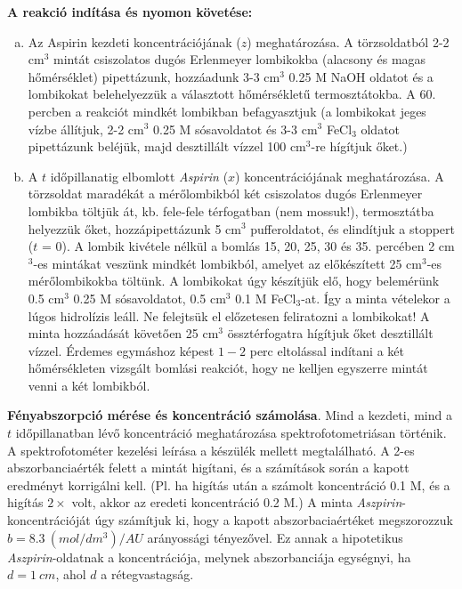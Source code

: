 \documentclass[a4paper, 12pt, twoside]{article}
\begin{document}
\textbf{A reakció indítása és nyomon követése:}

\begin{enumerate}[(a)]
\item Az Aspirin kezdeti koncentrációjának ($z$) meghatározása. A törzsoldatból 2-2 cm$^3$ mintát csiszolatos dugós Erlenmeyer lombikokba (alacsony és magas hőmérséklet) pipettázunk, hozzáadunk 3-3 cm$^3$ 0.25 M NaOH oldatot és a lombikokat belehelyezzük a választott hőmérsékletű termosztátokba. A 60. percben a reakciót mindkét lombikban befagyasztjuk (a lombikokat jeges vízbe állítjuk, 2-2 cm$^3$ 0.25 M sósavoldatot és 3-3 cm$^3$ FeCl$_3$ oldatot pipettázunk beléjük, majd desztillált vízzel 100 cm$^3$-re hígítjuk őket.)

\item A $t$ időpillanatig elbomlott \emph{Aspirin} ($x$) koncentrációjának meghatározása. A törzsoldat maradékát a mérőlombikból két csiszolatos dugós Erlenmeyer lombikba töltjük át, kb. fele-fele térfogatban (nem mossuk!), termosztátba helyezzük őket, hozzápipettázunk 5 cm$^3$ pufferoldatot, és elindítjuk a stoppert ($t$ = 0). A lombik kivétele nélkül a bomlás 15, 20, 25, 30 és 35. percében 2 cm$^3$-es mintákat veszünk mindkét lombikból, amelyet az előkészített 25 cm$^3$-es mérőlombikokba töltünk. A lombikokat úgy készítjük elő, hogy belemérünk 0.5 cm$^3$ 0.25 M sósavoldatot, 0.5 cm$^3$ 0.1 M FeCl$_3$-at. Így a minta vételekor a lúgos hidrolízis leáll. Ne felejtsük el előzetesen feliratozni a lombikokat! A minta hozzáadását követően 25 cm$^3$ össztérfogatra hígítjuk őket desztillált vízzel. Érdemes egymáshoz képest $1 - 2$ perc eltolással indítani a két hőmérsékleten vizsgált bomlási reakciót, hogy ne kelljen egyszerre mintát venni a két lombikból.
\end{enumerate}

\textbf{Fényabszorpció mérése és koncentráció számolása}. Mind a kezdeti, mind a $t$ időpillanatban lévő koncentráció meghatározása spektrofotometriásan történik. A spektrofotométer kezelési leírása a készülék mellett megtalálható. A 2-es abszorbanciaérték felett a mintát higítani, és a számítások során a kapott eredményt korrigálni kell. (Pl. ha higítás után a számolt koncentráció 0.1 M, és a higítás $2\times$ volt, akkor az eredeti koncentráció 0.2 M.) A minta \emph{Aszpirin}-koncentrációját úgy számítjuk ki, hogy a kapott abszorbaciaértéket megszorozzuk $b = 8.3~(mol/dm^3) / AU$ arányossági tényezővel. Ez annak a hipotetikus \emph{Aszpirin}-oldatnak a koncentrációja, melynek abszorbanciája egységnyi, ha $d = 1~cm$, ahol $d$ a rétegvastagság.
\end{document}
